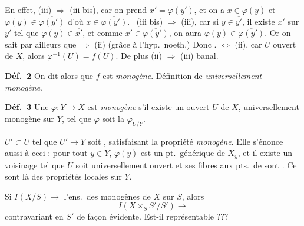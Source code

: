\documentclass[11pt,a4paper]{article}
\begin{document}
En effet, \struck{\ill{}} (iii) $\Rightarrow$ (iii bis), car
on prend $x' = \varphi(y')$, et on a $x \in \overline{\varphi(y)}$ et
$\varphi(y) \in \overline{\varphi(y')}$ d'où $x \in \overline{\varphi(y')}$.
\ (iii bis) $\Rightarrow$ (iii), car 
si $y \in \overline{y'}$, il existe $x'$ sur $y'$ tel que
$\varphi(y) \in \overline{x'}$, et comme $x' \in \overline{\varphi(y')}$, on aura
$\varphi(y) \in \overline{\varphi(y')}$.
Or on sait par ailleurs que 
\struck{\ill{}}  $\Rightarrow$ (ii) 
(grâce à l'hyp.\ noeth.) Donc .
   $\Leftrightarrow$ (ii), car  $U$  ouvert de $X$,
alors
$\varphi^{-1}(U) = f(U)$. De plus (ii) $\Rightarrow$ (iii) banal.

\textbf{Déf.~2} On dit alors que $f$ est \emph{monogène}.
Définition de \emph{universellement monogène}.

\textbf{Déf.~3} Une   \struck{\ill{}} $\varphi : Y \to X$
est  \emph{monogène} s'il existe un ouvert $U$ de $X$,
universellement monogène sur $Y$, tel que $\varphi$ soit la 
$\varphi_{U/Y}$.


\ill{} $U' \subset U$ tel que \ill{} $U' \to Y$ soit ,
satisfaisant  la propriété \emph{monogène}. Elle s'énonce
aussi à ceci : pour tout $y \in Y$, $\varphi(y)$ est un pt.\ générique
 de $X_y$, et il existe un \struck{\ill{}} voisinage
\ill{} tel que $U$ soit universellement ouvert \ill{} et \ill{} ses fibres
\ill{} aux pts.\ de \ill{} sont \ill{} \ill{}. Ce sont là des propriétés
locales sur $Y$.

Si $I(X/S) \to$ l'ens.\ des \ill{} monogènes de $X$ sur $S$, alors
\[
  I(X \times_S S' / S') \longrightarrow
\]
contravariant en $S'$ de façon évidente. Est-il représentable ???
\end{document}
